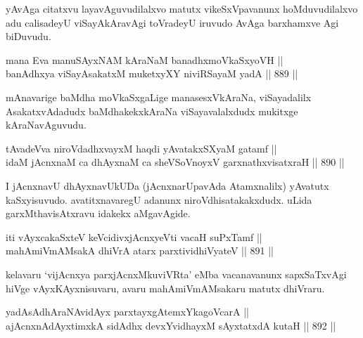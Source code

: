 \begin{artha}
yAvAga citatxvu layavAguvudilalxvo matutx vikeSxVpavanunx hoMduvudilalxvo adu calisadeyU viSayAkAravAgi toVradeyU iruvudo AvAga barxhamxve Agi biDuvudu.
\end{artha}


\begin{shl}
mana Eva manuSAyxNAM kAraNaM banadhxmoVkaSxyoVH || \\
banAdhxya viSayAsakatxM muketxyXY niviRSayaM yadA \hfill || 889 ||  
\end{shl}

\begin{artha}
mAnavarige baMdha moVkaSxgaLige manasesxVkAraNa, viSayadalilx AsakatxvAdadudx baMdhakekxkAraNa viSayavalalxdudx mukitxge kAraNavAguvudu.
\end{artha}


\begin{shl}
tAvadeVva niroVdadhxvayxM haqdi yAvatakxSXyaM gatamf || \\
idaM jAcnxnaM ca dhAyxnaM ca sheVSoVnoyxV garxnathxvisatxraH \hfill || 890 ||  
\end{shl}

\begin{artha}
I jAcnxnavU dhAyxnavUkUDa (jAcnxnarUpavAda Atamxnalilx) yAvatutx kaSxyisuvudo. avatitxnavaregU adanunx niroVdhisatakakxdudx. uLida garxMthavisAtxravu idakekx aMgavAgide.
\end{artha}


\begin{shl}
iti vAyxcakaSxteV keVcidivxjAcnxyeVti vacaH suPxTamf || \\
mahAmiVmAMsakA dhiVrA atarx parxtividhiVyateV \hfill || 891 ||  
\end{shl}

\begin{artha}
kelavaru `vijAcnxya parxjAcnxMkuviVRta' eMba vacanavanunx sapxSaTxvAgi hiVge vAyxKAyxnisuvaru, avaru mahAmiVmAMsakaru matutx dhiVraru.
\end{artha}


\begin{shl}
\footnotemark[1]yadA\s sAdhAraNA\s vidAyx parxtayxgAtemxYkagoVcarA || \\
ajAcnxnAdAyxtimxkA sidAdhx devxYvidhayxM sAyxtatxdA kutaH \hfill || 892 ||  
\end{shl}

